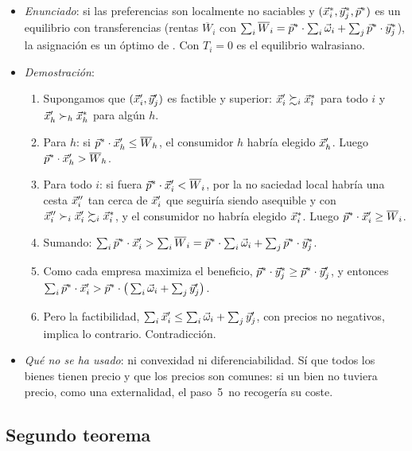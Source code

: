 \documentclass[11pt]{article}
\begin{document}
\begin{itemize}
\item \emph{Enunciado}: si las preferencias son localmente no saciables y $(\vec{x}^*_i,\vec{y}^*_j,\vec{p}^*)$ es un equilibrio con transferencias (rentas $\overline{W}_i$ con $\sum_i\overline{W}_i=\vec{p}^*\cdot\sum_i\vec{\omega}_i+\sum_j\vec{p}^*\cdot\vec{y}^*_j$), la asignación es un óptimo de . Con $T_i=0$ es el equilibrio walrasiano.
\item \emph{Demostración}:
  \begin{enumerate}
  \item Supongamos que $(\vec{x}'_i,\vec{y}'_j)$ es factible y  superior: $\vec{x}'_i\succsim_i\vec{x}^*_i$ para todo $i$ y $\vec{x}'_h\succ_h\vec{x}^*_h$ para algún $h$.
  \item Para $h$: si $\vec{p}^*\cdot\vec{x}'_h\leq\overline{W}_h$, el consumidor $h$ habría elegido $\vec{x}'_h$. Luego $\vec{p}^*\cdot\vec{x}'_h>\overline{W}_h$.
  \item Para todo $i$: si fuera $\vec{p}^*\cdot\vec{x}'_i<\overline{W}_i$, por la no saciedad local habría una cesta $\vec{x}''_i$ tan cerca de $\vec{x}'_i$ que seguiría siendo asequible y con $\vec{x}''_i\succ_i\vec{x}'_i\succsim_i\vec{x}^*_i$, y el consumidor no habría elegido $\vec{x}^*_i$. Luego $\vec{p}^*\cdot\vec{x}'_i\geq\overline{W}_i$.
  \item Sumando: $\sum_i\vec{p}^*\cdot\vec{x}'_i>\sum_i\overline{W}_i=\vec{p}^*\cdot\sum_i\vec{\omega}_i+\sum_j\vec{p}^*\cdot\vec{y}^*_j$.
  \item Como cada empresa maximiza el beneficio, $\vec{p}^*\cdot\vec{y}^*_j\geq\vec{p}^*\cdot\vec{y}'_j$, y entonces $\sum_i\vec{p}^*\cdot\vec{x}'_i>\vec{p}^*\cdot\big(\sum_i\vec{\omega}_i+\sum_j\vec{y}'_j\big)$.
  \item Pero la factibilidad, $\sum_i\vec{x}'_i\leq\sum_i\vec{\omega}_i+\sum_j\vec{y}'_j$, con precios no negativos, implica lo contrario. Contradicción.\findemo
  \end{enumerate}
\item \emph{Qué no se ha usado}: ni convexidad ni diferenciabilidad. Sí que todos los bienes tienen precio y que los precios son comunes: si un bien no tuviera precio, como una externalidad, el paso~5~no recogería su coste.
\end{itemize}

\subsection{Segundo teorema}\label{anexo:demostracion-segundo}
\end{document}
